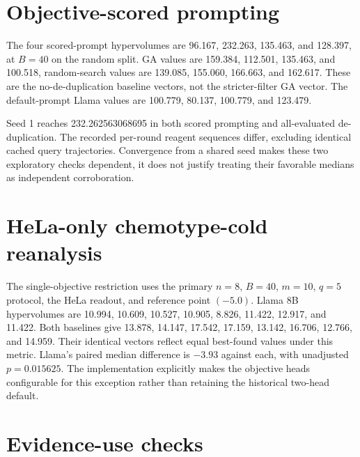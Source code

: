 \section{Objective-scored prompting}
\label{app:v3scored}
The four scored-prompt hypervolumes are 96.167, 232.263, 135.463, and 128.397, at $B=40$ on the random split. GA values are 159.384, 112.501, 135.463, and 100.518, random-search values are 139.085, 155.060, 166.663, and 162.617. These are the no-de-duplication baseline vectors, not the stricter-filter GA vector. The default-prompt Llama values are 100.779, 80.137, 100.779, and 123.479.

Seed 1 reaches 232.262563068695 in both scored prompting and all-evaluated de-duplication. The recorded per-round reagent sequences differ, excluding identical cached query trajectories. Convergence from a shared seed makes these two exploratory checks dependent, it does not justify treating their favorable medians as independent corroboration.

\section{HeLa-only chemotype-cold reanalysis}
\label{app:helaonly}
The single-objective restriction uses the primary $n=8$, $B=40$, $m=10$, $q=5$ protocol, the HeLa readout, and reference point $(-5.0)$. Llama 8B hypervolumes are 10.994, 10.609, 10.527, 10.905, 8.826, 11.422, 12.917, and 11.422. Both baselines give 13.878, 14.147, 17.542, 17.159, 13.142, 16.706, 12.766, and 14.959. Their identical vectors reflect equal best-found values under this metric. Llama's paired median difference is $-3.93$ against each, with unadjusted $p=0.015625$. The implementation explicitly makes the objective heads configurable for this exception rather than retaining the historical two-head default.

\section{Evidence-use checks}
\label{app:leakage8b}
